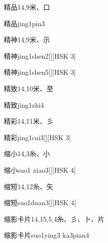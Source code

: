 \begin{entry}{精品}{14,9}{⽶、⼝}
  \begin{phonetics}{精品}{jing1pin3}
  \end{phonetics}
\end{entry}

\begin{entry}{精神}{14,9}{⽶、⽰}
  \begin{phonetics}{精神}{jing1shen2}[][HSK 3]
  \end{phonetics}
  \begin{phonetics}{精神}{jing1shen5}[][HSK 3]
  \end{phonetics}
\end{entry}

\begin{entry}{精致}{14,10}{⽶、⾄}
  \begin{phonetics}{精致}{jing1zhi4}
  \end{phonetics}
\end{entry}

\begin{entry}{精彩}{14,11}{⽶、⼺}
  \begin{phonetics}{精彩}{jing1cai3}[][HSK 3]
  \end{phonetics}
\end{entry}

\begin{entry}{缩小}{14,3}{⽷、⼩}
  \begin{phonetics}{缩小}{suo1 xiao3}[][HSK 4]
  \end{phonetics}
\end{entry}

\begin{entry}{缩短}{14,12}{⽷、⽮}
  \begin{phonetics}{缩短}{suo1duan3}[][HSK 4]
  \end{phonetics}
\end{entry}

\begin{entry}{缩影卡片}{14,15,5,4}{⽷、⼺、⼘、⽚}
  \begin{phonetics}{缩影卡片}{suo1ying3 ka3pian4}
  \end{phonetics}
\end{entry}

